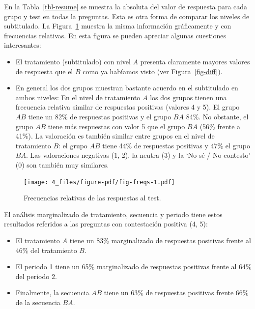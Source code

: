 \documentclass[
  12pt,
  a4paper,
  extrafontsizes,
  onecolumn,
  openright,
  table]{memoir}
\begin{document}
En la Tabla~\ref{tbl-resume} se muestra la absoluta del valor de
respuesta para cada grupo y test en todas la preguntas. Esta es otra
forma de comparar los niveles de subtitulado. La Figura~\ref{fig-freqs}
muestra la misma información gráficamente y con frecuencias relativas.
En esta figura se pueden apreciar algunas cuestiones interesantes:

\begin{itemize}
\item
  El tratamiento (subtitulado) con nivel \(A\) presenta claramente
  mayores valores de respuesta que el \(B\) como ya habíamos visto (ver
  Figura~\ref{fig-diff}).
\item
  En general los dos grupos muestran bastante acuerdo en el subtitulado
  en ambos niveles: En el nivel de tratamiento \(A\) los dos grupos
  tienen una frecuencia relativa similar de respuestas positivas
  (valores 4 y 5). El grupo \(AB\) tiene un 82\% de respuestas positivas
  y el grupo \(BA\) 84\%. No obstante, el grupo \(AB\) tiene más
  respuestas con valor 5 que el grupo \(BA\) (56\% frente a 41\%). La
  valoración es también similar entre grupos en el nivel de tratamiento
  \(B\): el grupo \(AB\) tiene 44\% de respuestas positivas y 47\% el
  grupo \(BA\). Las valoraciones negativas (1, 2), la neutra (3) y la
  \enquote*{No sé / No contesto} (0) son también muy similares.
\end{itemize}

\begin{figure}[h]

{\centering \texttt{[image: 4\_files/figure-pdf/fig-freqs-1.pdf]}

}

\caption{\label{fig-freqs}Frecuencias relativas de las respuestas al
test.}

\end{figure}

El análisis marginalizado de tratamiento, secuencia y periodo tiene
estos resultados referidos a las preguntas con contestación positiva (4,
5):

\begin{itemize}
\item
  El tratamiento \(A\) tiene un 83\% marginalizado de respuestas
  positivas frente al 46\% del tratamiento \(B\).
\item
  El periodo 1 tiene un 65\% marginalizado de respuestas positivas
  frente al 64\% del periodo 2.
\item
  Finalmente, la secuencia \(AB\) tiene un 63\% de respuestas positivas
  frente 66\% de la secuencia \(BA\).
\end{itemize}
\end{document}
